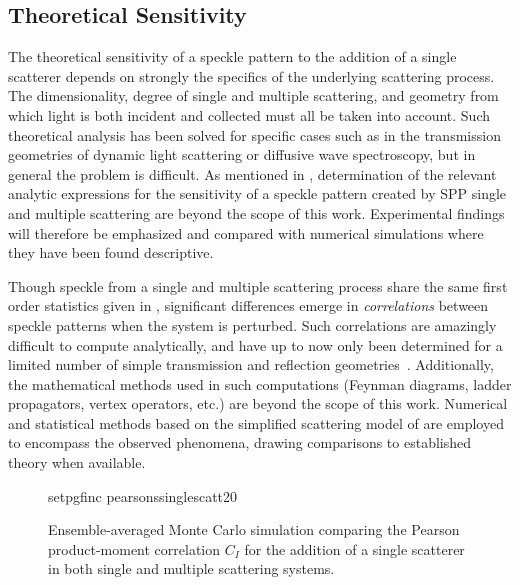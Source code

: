 \subsection{Theoretical Sensitivity}
The theoretical sensitivity of a speckle pattern to the addition of a single
scatterer depends on strongly the specifics of the underlying scattering
process.  The dimensionality, degree of single and multiple scattering, and
geometry from which light is both incident and collected must all be taken
into account.  Such theoretical analysis has been solved for specific cases
such as in the transmission geometries of dynamic light scattering or
diffusive wave spectroscopy, but in general the problem is difficult.  As
mentioned in , determination of the relevant analytic
expressions for the sensitivity of a speckle pattern created by SPP single and
multiple scattering are beyond the scope of this work.  Experimental findings
will therefore be emphasized and compared with numerical simulations where
they have been found descriptive.

Though speckle from a single and multiple scattering process share the same
first order statistics given in , significant differences
emerge in \textit{correlations} between speckle patterns when the system is
perturbed.  Such correlations are amazingly difficult to compute analytically,
and have up to now only been determined for a limited number of simple
transmission and reflection geometries~\cite{berkovits1994correlations}.
Additionally, the mathematical methods used in such computations (Feynman
diagrams, ladder propagators, vertex operators, etc.) are beyond the scope of
this work.  Numerical and statistical methods based on the simplified
scattering model of  are employed
to encompass the observed phenomena, drawing comparisons to established theory
when available.

\begin{figure}
\centering
{setpgfinc}
{pearsonssinglescatt20}
\caption{Ensemble-averaged Monte Carlo simulation comparing the Pearson
product-moment correlation $C_I$ for the addition of a single scatterer in
both single and multiple scattering systems.}
\label{fig:scatteringpearson}
\end{figure}

